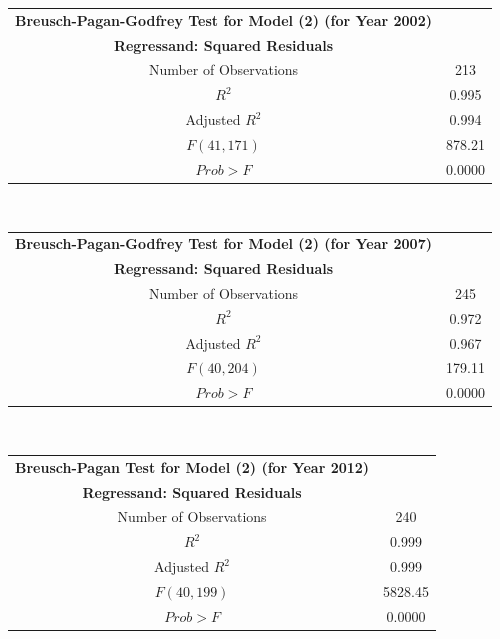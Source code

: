 \clearpage
\begin{table}[h]
\centering
\begin{tabular}{ c | c }
	\hline
	\textbf{Breusch-Pagan-Godfrey Test for Model (2) (for Year 2002)} \\
    \textbf{Regressand: Squared Residuals} \\
    \hline \hline
    Number of Observations & 213 \\
	\hline
    $R^{2}$ & 0.995 \\
    Adjusted $R^{2}$ & 0.994 \\
    \hline
    $F(41, 171)$ & 878.21 \\
    $Prob > F$ & 0.0000 \\
    \hline \hline
\end{tabular} \\
\end{table}

\begin{table}[h]
\centering
\begin{tabular}{ c | c }
	\hline
	\textbf{Breusch-Pagan-Godfrey Test for Model (2) (for Year 2007)} \\
    \textbf{Regressand: Squared Residuals} \\
    \hline \hline
    Number of Observations & 245 \\
	\hline
    $R^{2}$ & 0.972 \\
    Adjusted $R^{2}$ & 0.967 \\
    \hline
    $F(40, 204)$ & 179.11 \\
    $Prob > F$ & 0.0000 \\
    \hline \hline
\end{tabular} \\
\end{table}

\begin{table}[h]
\centering
\begin{tabular}{ c | c }
	\hline
	\textbf{Breusch-Pagan Test for Model (2) (for Year 2012)} \\
    \textbf{Regressand: Squared Residuals} \\
    \hline \hline
    Number of Observations & 240 \\
	\hline
    $R^{2}$ & 0.999 \\
    Adjusted $R^{2}$ & 0.999 \\
    \hline
    $F(40, 199)$ & 5828.45 \\
    $Prob > F$ & 0.0000 \\
    \hline \hline
\end{tabular} \\
\end{table}

